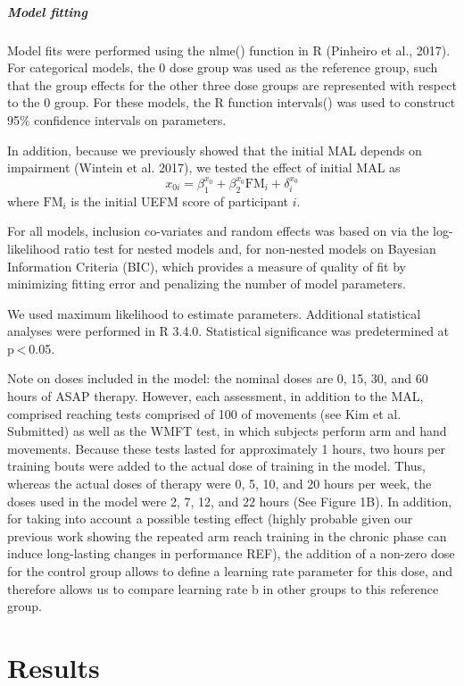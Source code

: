 \subparagraph{Model fitting}
Model fits were performed using the nlme() function in R (Pinheiro et al., 2017). 
For categorical models, the 0 dose group was used as the reference group, such that the group effects for the other three dose groups are represented with respect to the 0 group. 
For these models, the R function intervals() was used to construct 95\% confidence intervals on parameters.

In addition, because we previously showed that the initial MAL depends on impairment (Wintein et al. 2017), we tested the effect of initial MAL as 
\begin{equation}
	x_{0i} = β_1^{x_0} + β_2^{x_0} \text{FM}_i + \delta_i^{x_0}
\end{equation}
where $ \text{FM}_i $ is the initial UEFM score of participant $ i $.

For all models, inclusion co-variates and random effects was based on via the log-likelihood ratio test for nested models and, for non-nested models on Bayesian Information Criteria (BIC), which provides a measure of quality of fit by minimizing fitting error and penalizing the number of model parameters. 

We used maximum likelihood to estimate parameters. Additional statistical analyses were performed in R 3.4.0. 
Statistical significance was predetermined at p < 0.05. 

Note on doses included in the model: the nominal doses are 0, 15, 30, and 60 hours of ASAP therapy. 
However, each assessment, in addition to the MAL, comprised reaching tests comprised of 100 of movements (see Kim et al. Submitted) as well as the WMFT test, in which subjects perform arm and hand movements. 
Because these tests lasted for approximately 1 hours, two hours per training bouts were added to the actual dose of training in the model. 
Thus, whereas the actual doses of therapy were 0, 5, 10, and 20 hours per week, the doses used in the model were 2, 7, 12, and 22 hours (See Figure 1B). 
In addition, for taking into account a possible testing effect (highly probable given our previous work showing the repeated arm reach training in the chronic phase can induce long-lasting changes in performance REF), the addition of a non-zero dose for the control group allows to define a learning rate parameter for this dose, and therefore allows us to compare learning rate b in other groups to this reference group.


\section{Results}

